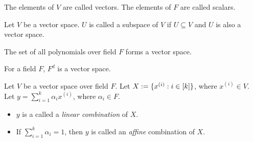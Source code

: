 \documentclass[a4paper,12pt,fleqn]{article}
\newcommand*{\thmdepurl}[1]{https://sharmaeklavya2.github.io/theoremdep/nodes#1}
\newcommand*{\thmdephref}[2]{\href{\thmdepurl{#1}}{#2}}
\newenvironment*{tightemize}{\begin{itemize}[noitemsep]}{\end{itemize}}
\newcommand*{\zerovec}{\mathbf{0}}
\begin{document}
\begin{definition}
\begin{comment}
\item \textbf{Unit scalar}: $\forall x \in V, 1x = x$,
    where $1$ is the multiplicative identity of $F$.
\end{itemize}
\item Distributivity:
\begin{itemize}
\item $\forall a \in F, \forall b \in F, \forall x \in V, (a+b)x = (ax + bx)$.
\item $\forall a \in F, \forall x \in V, \forall y \in V, a(x+y) = (ax + ay)$.
\end{itemize}
\end{itemize}
\end{comment}
The elements of $V$ are called vectors. The elements of $F$ are called scalars.
\end{definition}

\begin{definition}[Subspace]
Let $V$ be a vector space. $U$ is called a subspace of $V$ if
$U \subseteq V$ and $U$ is also a vector space.
\end{definition}

\begin{comment}
\begin{lemma}[\thmdephref{/linear-algebra/vector-spaces/zero.html}{Zeros in vector space}, DWAP]
For $a, 0$ in field $F$ and $x, \zerovec$ in vector space $V$,
$ax = 0 \iff a=0 \textrm{ or } x=\zerovec$.
\end{lemma}
\end{comment}

\begin{theorem}[DWAP]
The set of all polynomials over field $F$ forms a vector space.
\end{theorem}

\begin{theorem}[DWAP]
For a field $F$, $F^d$ is a vector space.
\end{theorem}

\begin{definition}
Let $V$ be a vector space over field $F$.
Let $X := \{x^{(i)}: i \in [k]\}$, where $x^{(i)} \in V$.
Let $y = \sum_{i=1}^k \alpha_i x^{(i)}$, where $\alpha_i \in F$.
\begin{tightemize}
\item $y$ is a called a \emph{linear combination} of $X$.
\item If $\sum_{i=1}^k \alpha_i = 1$, then
    $y$ is called an \emph{affine} combination of $X$.
\end{tightemize}
\end{definition}
\end{document}
